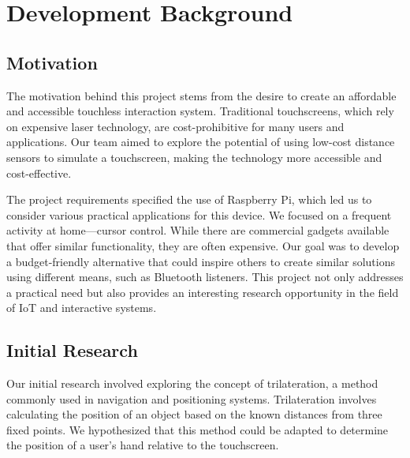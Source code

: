 \documentclass[12pt,a4paper]{article}
\begin{document}
\section{Development Background}

\subsection{Motivation}
The motivation behind this project stems from the desire to create an affordable and accessible touchless interaction system. Traditional touchscreens, which rely on expensive laser technology, are cost-prohibitive for many users and applications. Our team aimed to explore the potential of using low-cost distance sensors to simulate a touchscreen, making the technology more accessible and cost-effective.

The project requirements specified the use of Raspberry Pi, which led us to consider various practical applications for this device. We focused on a frequent activity at home—cursor control. While there are commercial gadgets available that offer similar functionality, they are often expensive. Our goal was to develop a budget-friendly alternative that could inspire others to create similar solutions using different means, such as Bluetooth listeners. This project not only addresses a practical need but also provides an interesting research opportunity in the field of IoT and interactive systems.

\subsection{Initial Research}
Our initial research involved exploring the concept of trilateration, a method commonly used in navigation and positioning systems. Trilateration involves calculating the position of an object based on the known distances from three fixed points. We hypothesized that this method could be adapted to determine the position of a user's hand relative to the touchscreen.
\end{document}
